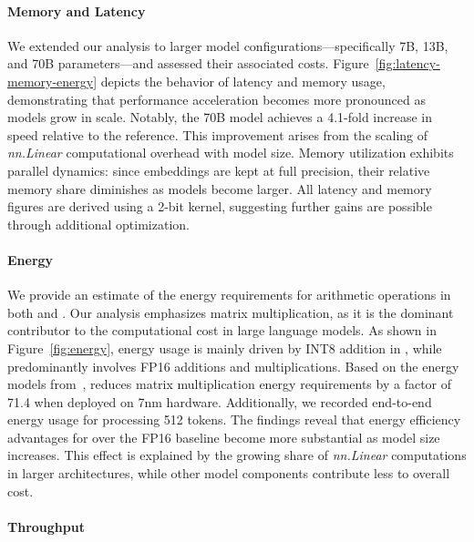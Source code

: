 \paragraph{Memory and Latency}

We extended our analysis to larger model configurations—specifically 7B, 13B, and 70B parameters—and assessed their associated costs. Figure~\ref{fig:latency-memory-energy} depicts the behavior of latency and memory usage, demonstrating that performance acceleration becomes more pronounced as models grow in scale. Notably, the  70B model achieves a 4.1-fold increase in speed relative to the  reference. This improvement arises from the scaling of \emph{nn.Linear} computational overhead with model size. Memory utilization exhibits parallel dynamics: since embeddings are kept at full precision, their relative memory share diminishes as models become larger. All latency and memory figures are derived using a 2-bit kernel, suggesting further gains are possible through additional optimization.

\paragraph{Energy}

We provide an estimate of the energy requirements for arithmetic operations in both  and . Our analysis emphasizes matrix multiplication, as it is the dominant contributor to the computational cost in large language models. As shown in Figure~\ref{fig:energy}, energy usage is mainly driven by INT8 addition in , while  predominantly involves FP16 additions and multiplications. Based on the energy models from~\cite{energycost, pokebnn},  reduces matrix multiplication energy requirements by a factor of 71.4 when deployed on 7nm hardware. Additionally, we recorded end-to-end energy usage for processing 512 tokens. The findings reveal that energy efficiency advantages for  over the FP16  baseline become more substantial as model size increases. This effect is explained by the growing share of \emph{nn.Linear} computations in larger architectures, while other model components contribute less to overall cost.

\paragraph{Throughput}

